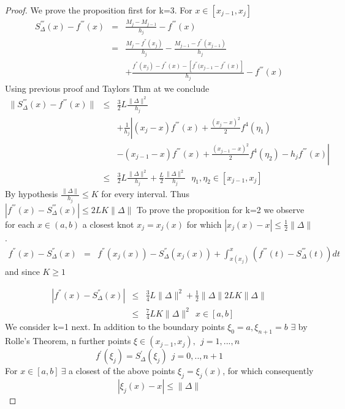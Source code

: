 \begin{proof}
We prove the proposition first for k=3.
For $x \in [x_{j-1},x_j]$
\begin{eqnarray*}
S^{'''}_{\Delta}(x)-f^{'''}(x)& = &\frac{M_j-M_{j-1}}{h_j} - f^{'''}(x)\\
& = & \frac{M_j - f^{''}(x_j)}{h_j} -\frac{M_{j-1}-f^{''}(x_{j-1})}{h_j}\\
& & + \frac{f^{''}(x_j)-f^{''}(x) - [f^{''}(x_{j-1}-f^{''}(x)]}{h_j} -f^{'''}(x)
\end{eqnarray*}
Using previous proof and Taylors Thm at we conclude
\begin{eqnarray*}
 \lVert S^{'''}_{\Delta}(x)-f^{'''}(x)\rVert  &\leq& \frac{3}{2}L\frac{\lVert \Delta\rVert ^2}{h_j}\\
& & + \frac{1}{h_j} \left|(x_j-x)f^{'''}(x) + \frac{(x_j-x)^2}{2} f^4(\eta_1)\right.\\
& & \left.- (x_{j-1}-x)f^{'''}(x) + \frac{(x_{j-1}-x)^2}{2} f^4(\eta_2) - h_jf^{'''}(x) \right| \\
&\leq& \frac{3}{2} L \frac{\lVert \Delta\rVert ^2}{h_j} + \frac{L}{2} \frac{\lVert \Delta\rVert ^{2}}{h_j} \ \ \ \eta_1,\eta_2 \in [x_{j-1},x_{j}]
\end{eqnarray*}
By hypothesis $\frac{\lVert \Delta\rVert }{h_j} \leq K $ for every interval.
Thus $|f^{'''}(x) - S^{'''}_{\Delta}(x)| \leq 2LK\lVert \Delta\rVert $
To prove the proposition for k=2 we observe for each $x \in (a,b)$ a closest
knot $x_j = x_j(x)$ for which $|x_j(x) - x| \leq \frac{1}{2}\lVert \Delta\rVert $.
\begin{eqnarray*}
f^{''}(x) - S_{\Delta}^{''}(x) & = & f^{''}(x_j(x)) - S_{\Delta}^{''}(x_j(x)) 
+ \int^{x}_{x(x_j)}(f^{'''}(t)-S_{\Delta}^{'''}(t))dt
\end{eqnarray*}
and since $K \geq 1$

\begin{eqnarray*}
|f^{''}(x) - S_{\Delta}^{''}(x)| & \leq & \frac{3}{4} L \lVert \Delta\rVert ^2 +\frac{1}{2}\lVert \Delta\rVert 2LK\lVert \Delta\rVert  \\
& \leq & \frac{7}{4}LK\lVert \Delta\rVert ^2  \ \ x \in [a,b]
\end{eqnarray*}
We consider k=1 next. In addition to the boundary points $\xi_0 = a, \xi_{n+1}=b$
$\exists$ by Rolle's Theorem, n further points $\xi \in (x_{j-1},x_j),\ \ j=1,...,n$
\[
f^{'}(\xi_j) = S_{\Delta}^{'}(\xi_j) \ \ j=0,..,n+1
\]
For $x \in [a,b] \ \exists$ a closest of the above points $\xi_j = \xi_j(x)$, for
which consequently 
\[
|\xi_j(x)-x| \leq \lVert \Delta\rVert 
\]


\end{proof}
